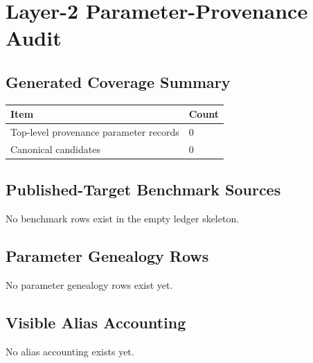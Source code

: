 \providecommand{\AuditPath}[1]{\begingroup\footnotesize\nolinkurl{#1}\endgroup}
\providecommand{\AuditID}[1]{\begingroup\footnotesize\nolinkurl{#1}\endgroup}

\chapter{Layer-2 Parameter-Provenance Audit}
\label{app:parameter-provenance-audit}

\section{Generated Coverage Summary}
\label{sec:parameter-provenance-generated-summary}

\begin{longtable}{L{0.45\textwidth}L{0.45\textwidth}}
\toprule
Item & Count \\
\midrule
\endhead
Top-level provenance parameter records & 0 \\
Canonical candidates & 0 \\
\bottomrule
\end{longtable}

\section{Published-Target Benchmark Sources}
\label{sec:parameter-provenance-benchmarks}

No benchmark rows exist in the empty ledger skeleton.

\section{Parameter Genealogy Rows}
\label{sec:parameter-provenance-genealogy}

No parameter genealogy rows exist yet.

\section{Visible Alias Accounting}
\label{sec:parameter-provenance-alias-accounting}

No alias accounting exists yet.
